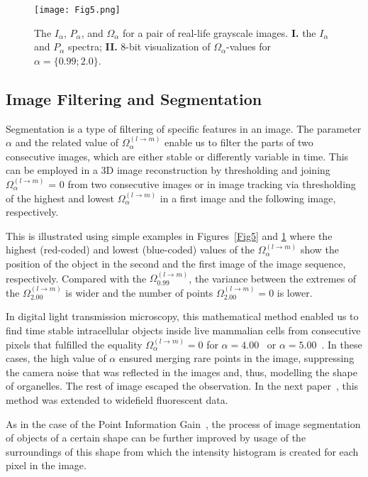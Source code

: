 \documentclass[entropy,article,accept,moreauthors,pdftex,10pt,a4paper]{mdpi}
\begin{document}
\begin{figure}[H]
\centering
\texttt{[image: Fig5.png]}
\caption[]{{The} $I_\alpha$, $P_\alpha$, and $\Omega_{\alpha}$ for a pair of real-life grayscale images. \textbf{I.} the $I_\alpha$ and $P_\alpha$ spectra; \textbf{II.} 8-bit visualization of $\Omega_{\alpha}$-values for $\alpha = \{0.99; 2.0\}$.}
\label{Fig4}
\end{figure}


\subsection{Image Filtering and Segmentation}

Segmentation is a type of filtering of specific features in an image. The parameter $\alpha$ and the related value of $\Omega_\alpha^{(l \rightarrow m)}$ enable us to filter the parts of two consecutive images, which are either stable or differently variable in time. This can be employed in a 3D image reconstruction by thresholding and joining $\Omega_\alpha^{(l \rightarrow m)}$ = 0 from two consecutive images or in image tracking via thresholding of the highest and lowest $\Omega_\alpha^{(l \rightarrow m)}$ in a first image and the following image, respectively.

This is illustrated using simple examples in Figures~\ref{Fig5} and \ref{Fig4} where the highest (red-coded) and lowest (blue-coded) values of the $\Omega_\alpha^{(l \rightarrow m)}$ show the position of the object in the second and the first image of the image sequence, respectively. Compared with the $\Omega_{0.99}^{(l \rightarrow m)}$, the variance between the extremes of the $\Omega_{2.00}^{(l \rightarrow m)}$ is wider and the number of points $\Omega_{2.00}^{(l \rightarrow m)} = 0$ is lower.

In digital light transmission microscopy, this mathematical method enabled us to find time stable intracellular objects inside live mammalian cells from consecutive pixels that fulfilled the equality $\Omega_{\alpha}^{(l \rightarrow m)} = 0$ for $\alpha = 4.00$~\cite{Ryc15} or $\alpha = 5.00$~\cite{Ryc16c}. In these cases, the high value of $\alpha$ ensured merging rare points in the image, suppressing the camera noise that was reflected in the images and, thus, modelling the shape of organelles. The rest of image escaped the observation. In the next paper~\cite{RycBMC}, this method was extended to widefield fluorescent data.

As in the case of the Point Information Gain~\cite{Ryc16a}, the process of image segmentation of objects of a certain shape can be further improved by usage of the surroundings of this shape from which the intensity histogram is created for each pixel in the image.
\end{document}
